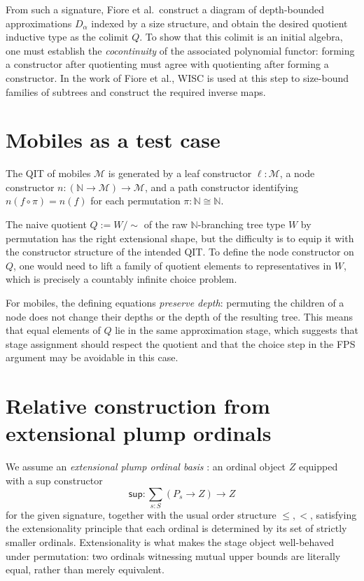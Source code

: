 \documentclass{easychair}
\begin{document}
From such a signature, Fiore et al.\ construct a diagram of
depth-bounded approximations \(D_\alpha\) indexed by a size structure,
and obtain the desired quotient inductive type as the colimit \(Q\). To
show that this colimit is an initial algebra, one must establish the
\emph{cocontinuity} of the associated polynomial functor: forming a
constructor after quotienting must agree with quotienting after forming a
constructor. In the work of Fiore et al., WISC is used at this step to
size-bound families of subtrees and construct the required inverse maps.

\section{Mobiles as a test case}

The QIT of mobiles \(\mathcal{M}\) is generated by a leaf constructor
\(\ell : \mathcal{M}\), a node constructor
\(n : (\mathbb{N} \to \mathcal{M}) \to \mathcal{M}\),
and a path constructor identifying \(n(f \circ \pi) = n(f)\) for each
permutation \(\pi : \mathbb{N} \cong \mathbb{N}\).

The naive quotient \(Q := W/{\sim}\) of the raw \(\mathbb{N}\)-branching
tree type \(W\) by permutation has the right extensional shape, but the
difficulty is to equip it with the constructor structure of the intended
QIT\@. To define the node constructor on \(Q\), one would need to lift a
family of quotient elements to representatives in \(W\), which is
precisely a countably infinite choice problem.

For mobiles, the defining equations \emph{preserve depth}: permuting the
children of a node does not change their depths or the depth of the
resulting tree. This means that equal elements of \(Q\) lie in the same
approximation stage, which suggests that stage assignment should respect
the quotient and that the choice step in the FPS argument may be
avoidable in this case.

\section{Relative construction from extensional plump ordinals}

We assume an \emph{extensional plump ordinal basis}
\cite{taylor1996-plump}: an ordinal object \(Z\) equipped with a
sup constructor
\[
  \mathsf{sup} : \textstyle\sum_{s:S}(P_s \to Z) \to Z
\]
for the given signature, together with the usual order structure
\(\le, <\), satisfying the extensionality principle that each ordinal is
determined by its set of strictly smaller ordinals. Extensionality is
what makes the stage object well-behaved under permutation: two ordinals
witnessing mutual upper bounds are literally equal, rather than merely
equivalent.
\end{document}
